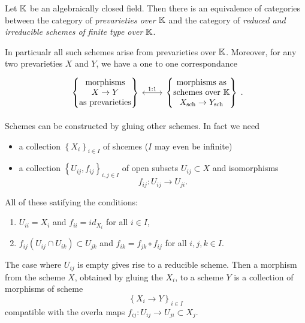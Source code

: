 \begin{prop}
	Let $\mathbb{K}$ be an algebraically closed field.
	Then there is an equivalence of categories between the category of {\em prevarieties over $\mathbb{K}$}
	and the category of {\em reduced and irreducible schemes of finite type over $\mathbb{K}$}.
	
	In particualr all such schemes arise from prevarieties over $\mathbb{K}$.
	Moreover, for any two prevarieties $X$ and $Y$, we have a
	one to one correspondance
	\begin{equation*}
	\begin{tikzcd}
		\left\{ 
		\begin{matrix}
			\text{morphisms}\\
			X \to Y\\
			\text{as prevarieties}
		\end{matrix} 
		\right\} \arrow[r, "1:1", leftrightarrow] &
		\left\{ 
		\begin{matrix}
			\text{morphisms as}\\
			\text{schemes over }\K\\
			X_{\text{sch}} \to Y_{\text{sch}}\\
		\end{matrix} 
		\right\} 
	\end{tikzcd}
	.\end{equation*} 
\end{prop} 

\begin{rem}
	Schemes can be constructed by gluing other schemes.
	In fact we need
	\begin{itemize}
		\item a collection $\left\{ X_i \right\}_{i \in I}$ of shcemes ($I$
			may even be infinite)
		\item a collection $\left\{ U_{ij}, f_{ij} \right\}_{i,j \in I}$ of open subsets
			$U_{ij} \subset X$ and isomorphisms
			\begin{equation}
			f_{ij}: U_{ij} \to U_{ji}
			.\end{equation} 
	\end{itemize}
	All of these satifying the conditions:
	\begin{enumerate}
		\item $U_{ii} = X_i$ and $f_{ii} = id_{X_i}$ for all $i \in I$,
		\item $f_{ij} \left( U_{ij} \cap U_{ik} \right) \subset U_{jk}$ and
			$f_{ik} = f_{jk} \circ f_{ij}$
			for all $i,j,k \in I$.
	\end{enumerate}
	The case where $U_{ij}$ is empty gives rise to a reducible scheme.
	Then a morphism from the scheme $X$, obtained by gluing the $X_i$,
	to a scheme $Y$ is a collection of morphisms of scheme
	\begin{equation}
	\left\{ X_i \to Y \right\}_{i \in I} 
	\end{equation} 
	compatible with the overla maps $f_{ij}: U_{ij} \to U_{ji} \subset X_j$.
\end{rem} 

